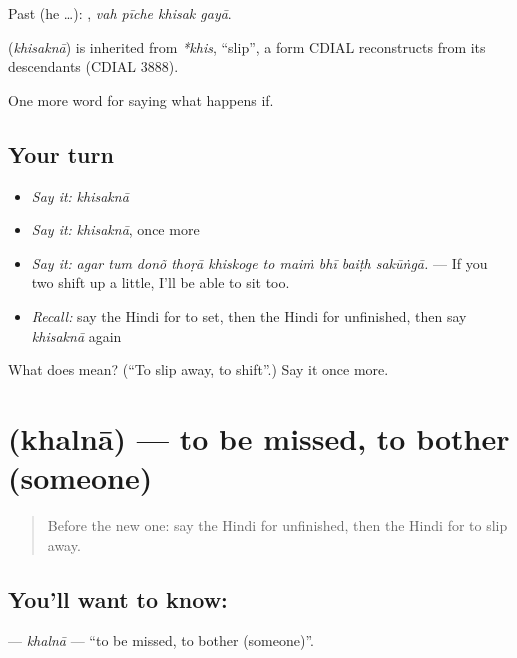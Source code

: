 Past (he …):    , \emph{vah pīche khisak gayā}.

\begin{cousinweb}
\textbf{} (\emph{khisaknā}) is inherited from \emph{*khis}, \textquotedblleft{}slip\textquotedblright{}, a form CDIAL reconstructs from its descendants (CDIAL 3888).
\end{cousinweb}

\begin{grammarlens}[title={What you've built}]
One more word for saying what happens if.
\end{grammarlens}

\subsection*{Your turn}
\begin{itemize}
\raggedright
  \item \emph{Say it:} \emph{khisaknā}
  \item \emph{Say it:} \emph{khisaknā}, once more
  \item \emph{Say it:} \emph{agar tum donõ thoṛā khiskoge to maiṁ bhī baiṭh sakūṅgā.} — If you two shift up a little, I'll be able to sit too.
  \item \emph{Recall:} say the Hindi for to set, then the Hindi for unfinished, then say \emph{khisaknā} again
\end{itemize}

\begin{tcolorbox}[breakable,colback=teal!4,colframe=teal!35!black,title={Before you move on}]
What does  mean? (\textquotedblleft{}To slip away, to shift\textquotedblright{}.) Say it once more.
\end{tcolorbox}
\section[\texorpdfstring{\hi{खलना} (khalnā)}{खलना (khalnā)}]{ (khalnā) — to be missed, to bother (someone)}

\label{lesson:HI-C386-khalna}



\begin{quote}
Before the new one: say the Hindi for unfinished, then the Hindi for to slip away.
\end{quote}

\subsection*{You'll want to know: }
\textbf{} — \emph{khalnā} — \textquotedblleft{}to be missed, to bother (someone)\textquotedblright{}.


